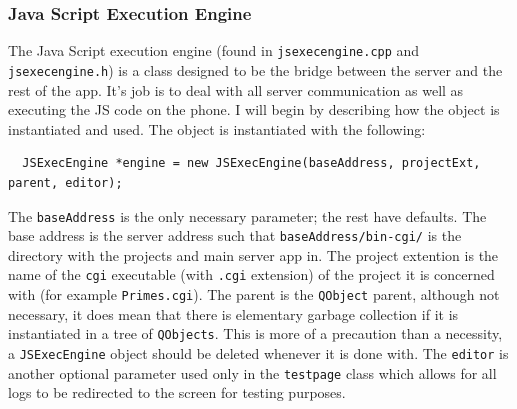 \documentclass{article}
\begin{document}
\subsubsection{Java Script Execution Engine}
The Java Script execution engine (found in \texttt{jsexecengine.cpp} and \texttt{jsexecengine.h}) is a class designed to be the bridge between
the server and the rest of the app. It's job is to deal with all server communication as well as executing the JS code on the phone.
I will begin by describing how the object is instantiated and used. The object is instantiated with the following:
\begin{verbatim}
  JSExecEngine *engine = new JSExecEngine(baseAddress, projectExt, parent, editor);
\end{verbatim}
The \texttt{baseAddress} is the only necessary parameter; the rest have defaults. The base address is the server address such that
\texttt{baseAddress/bin-cgi/} is the directory with the projects and main server app in. The project extention is the name of the
\texttt{cgi} executable (with \texttt{.cgi} extension) of the project it is concerned with (for example \texttt{Primes.cgi}).
The parent is the \texttt{QObject} parent, although not necessary, it does mean that there is elementary garbage collection if
it is instantiated in a tree of \texttt{QObjects}. This is more of a precaution than a necessity, a \texttt{JSExecEngine} object
should be deleted whenever it is done with. The \texttt{editor} is another optional parameter used only in the \texttt{testpage}
class which allows for all logs to be redirected to the screen for testing purposes.
\end{document}
